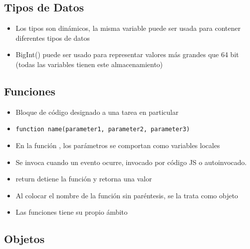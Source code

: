 \documentclass{article}
\begin{document}
 \subsection{Tipos de Datos}

 \begin{itemize}
   \item Los tipos son dinámicos, la misma variable puede ser usada para contener diferentes tipos de datos
   \item BigInt() puede ser usado para representar valores más grandes que 64 bit (todas las variables tienen este almacenamiento)
 \end{itemize}

 \subsection{Funciones}

 \begin{itemize}
   \item Bloque de código designado a una tarea en particular
   \item \lstinline{function name(parameter1, parameter2, parameter3)}
   \item En la función , los parámetros  se comportan como variables locales
   \item Se invoca cuando un evento ocurre, invocado por código JS o autoinvocado.
 \item return detiene la función y retorna una valor
 \item Al colocar el nombre de la función sin paréntesis, se la trata como objeto
 \item Las funciones tiene su propio ámbito
 \end{itemize}

 \subsection{Objetos}

\end{document}
